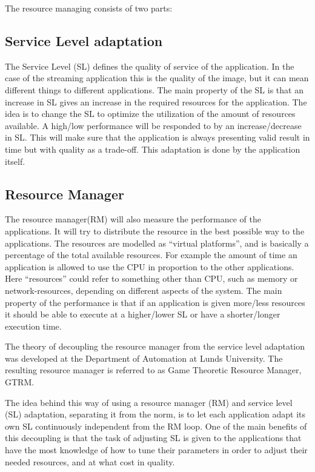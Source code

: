 \documentclass[nobiblatex]{LTHthesis}
\begin{document}
The resource managing consists of two parts:
\subsection{Service Level adaptation}
The Service Level (SL) defines the quality of service of the application. In the case of the streaming application this is the quality of the image, but it can mean different things to different applications. The main property of the SL is that an increase in SL gives an increase in the required resources for the application. The idea is to change the SL to optimize the utilization of the amount of resources available. A high/low performance will be responded to by an increase/decrease in SL.
This will make sure that the application is always presenting valid result in time but with quality as a trade-off. This adaptation is done by the application itself.

\subsection{Resource Manager}
The resource manager(RM) will also measure the performance of the applications. It will try to distribute the resource in the best possible way to the applications. The resources are modelled as “virtual platforms”, and is basically a percentage of the total available resources. For example the amount of time an application is allowed to use the CPU in proportion to the other applications. Here “resources” could refer to something other than CPU, such as memory or network-resources, depending on different aspects of the system. The main property of the performance is that if an application is given more/less resources it should be able to execute at a higher/lower SL or have a shorter/longer execution time.

The theory of decoupling the resource manager from the service level adaptation was developed at the Department of Automation at Lunds University. The resulting resource manager is referred to as Game Theoretic Resource Manager, GTRM. 

The idea behind this way of using a resource manager (RM) and service level (SL) adaptation, separating it from the norm, is to let each application adapt its own SL continuously independent from the RM loop. One of the main benefits of this decoupling is that the task of adjusting SL is given to the applications that have the most knowledge of how to tune their parameters in order to adjust their needed resources, and at what cost in quality.
\end{document}
